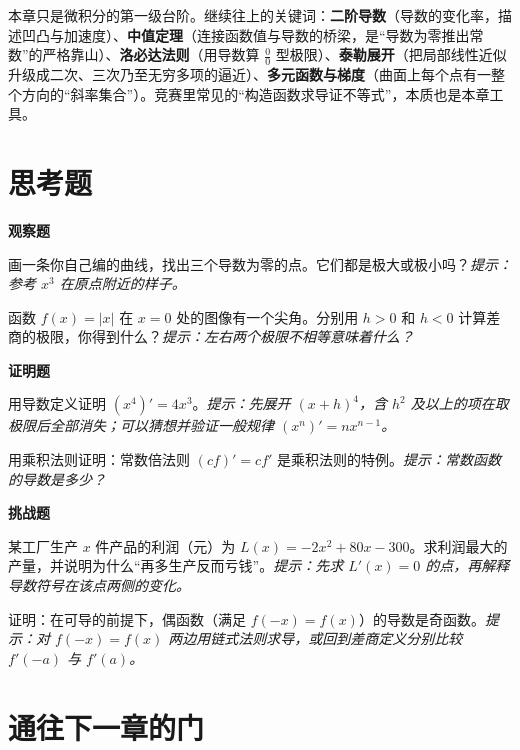 \begin{pandeng}
本章只是微积分的第一级台阶。继续往上的关键词：\textbf{二阶导数}（导数的变化率，描述凹凸与加速度）、\textbf{中值定理}（连接函数值与导数的桥梁，是“导数为零推出常数”的严格靠山）、\textbf{洛必达法则}（用导数算 $\frac{0}{0}$ 型极限）、\textbf{泰勒展开}（把局部线性近似升级成二次、三次乃至无穷多项的逼近）、\textbf{多元函数与梯度}（曲面上每个点有一整个方向的“斜率集合”）。竞赛里常见的“构造函数求导证不等式”，本质也是本章工具。
\end{pandeng}

\section*{思考题}

\textbf{观察题}
\begin{sikao}
  \item 画一条你自己编的曲线，找出三个导数为零的点。它们都是极大或极小吗？\emph{提示：参考 $x^3$ 在原点附近的样子。}
  \item 函数 $f(x)=|x|$ 在 $x=0$ 处的图像有一个尖角。分别用 $h>0$ 和 $h<0$ 计算差商的极限，你得到什么？\emph{提示：左右两个极限不相等意味着什么？}
\end{sikao}

\textbf{证明题}
\begin{sikao}
  \item 用导数定义证明 $(x^4)'=4x^3$。\emph{提示：先展开 $(x+h)^4$，含 $h^2$ 及以上的项在取极限后全部消失；可以猜想并验证一般规律 $(x^n)'=nx^{n-1}$。}
  \item 用乘积法则证明：常数倍法则 $(cf)'=cf'$ 是乘积法则的特例。\emph{提示：常数函数的导数是多少？}
\end{sikao}

\textbf{挑战题}
\begin{sikao}
  \item 某工厂生产 $x$ 件产品的利润（元）为 $L(x)=-2x^2+80x-300$。求利润最大的产量，并说明为什么“再多生产反而亏钱”。\emph{提示：先求 $L'(x)=0$ 的点，再解释导数符号在该点两侧的变化。}
  \item 证明：在可导的前提下，偶函数（满足 $f(-x)=f(x)$）的导数是奇函数。\emph{提示：对 $f(-x)=f(x)$ 两边用链式法则求导，或回到差商定义分别比较 $f'(-a)$ 与 $f'(a)$。}
\end{sikao}

\section*{通往下一章的门}

